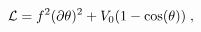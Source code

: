 \begin{equation}
\label{eq:pseudo}
{\cal L} = f^2 (\partial \theta)^2 + V_0 (1-\cos(\theta)) \;,
\end{equation}


